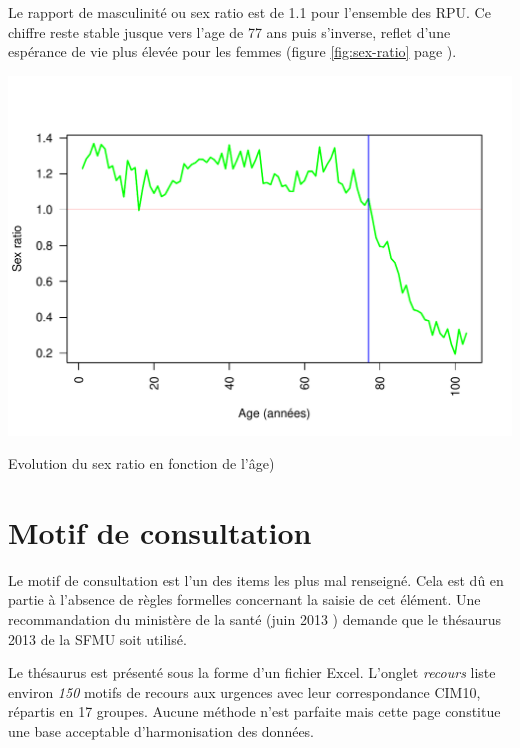 \documentclass[12pt,english,french,twoside]{book}\usepackage[]{graphicx}\usepackage[]{color}
\makeatletter
\def\maxwidth{ %
  \ifdim\Gin@nat@width>\linewidth
    \linewidth
  \else
    \Gin@nat@width
  \fi
}
\newenvironment{knitrout}{}{} %
\makeatother
\begin{document}
Le rapport de masculinité ou sex ratio est de 1.1 pour l'ensemble des RPU. Ce chiffre reste stable jusque vers l'age de 77 ans puis s'inverse, reflet d'une espérance de vie plus élevée pour les femmes (figure \ref{fig:sex-ratio} page \pageref{fig:sex-ratio}).

\begin{center}
\begin{knitrout}
\color{fgcolor}
\includegraphics[width=\maxwidth]{figure/sr_graphe-1} 

\end{knitrout}
\caption{Evolution du sex ratio en fonction de l'âge)}
\label{fig:sex-ratio}
\end{center}



\newpage
\chapter{Motif de consultation}



Le motif de consultation est l'un des items les plus mal renseigné. Cela est dû en partie à l'absence de règles formelles concernant la saisie de cet élément. Une recommandation du ministère de la santé (juin 2013 \cite{12,13}) demande que le thésaurus 2013 de la SFMU \cite{9} soit utilisé.

Le thésaurus est présenté sous la forme d'un fichier Excel. L'onglet \emph{recours} liste environ \emph{150} motifs de recours aux urgences avec leur correspondance CIM10, répartis en 17 groupes. Aucune méthode n'est parfaite mais cette page constitue une base acceptable d'harmonisation des données.
\end{document}
